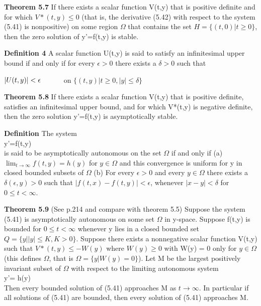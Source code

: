 \documentclass{article}
\newcommand\tab[1][1cm]{\hspace*{#1}}
\begin{document}
\textbf {Theorem 5.7} If there exists a scalar function V(t,y) that is positive definite and for which $V*(t,y) \leq 0$ (that is, the derivative (5.42) with respect to the system (5.41) is nonpositive) on some region $\Omega$ that contains the set $H = \{(t,0) | t \geq 0\}$, then the zero solution of y'=f(t,y) is stable.

\textbf {Definition 4} A scalar function U(t,y) is said to satisfy an infinitesimal upper bound if and only if for every $\epsilon > 0$ there exists a $\delta > 0$ such that
\begin{center}
$|U(t,y)| < \epsilon \tab$ on $\{(t,y)| t \geq 0, |y| \leq \delta\}$
\end{center}

\textbf {Theorem 5.8} If there exists a scalar function V(t,y) that is positive definite, satisfies an infinitesimal upper bound, and for which V*(t,y) is negative definite, then the zero solution y'=f(t,y) is asymptotically stable.

\textbf {Definition} The system \\
y'=f(t,y) \\
is said to be asymptotically autonomous on the set $\Omega$ if and only if (a) $\lim_{t \to \infty} f(t,y) = h(y)$ for $y \in \Omega$ and this convergence is uniform for y in closed bounded subsets of $\Omega$ (b) For every $\epsilon > 0$ and every $y \in \Omega$ there exists a $\delta(\epsilon, y)> 0$ such that $|f(t,x) - f(t,y)| < \epsilon$, whenever $|x-y|< \delta$ for $0 \leq t < \infty$.

\textbf {Theorem 5.9} (See p.214 and compare with theorem 5.5) Suppose the system (5.41) is asymptotically autonomous on some set $\Omega$ in y-space. Suppose f(t,y) is bounded for $0 \leq t < \infty$ whenever y lies in a closed bounded set $Q = \{y| |y| \leq K, K > 0\}$. Suppose there exists a nonnegative scalar function V(t,y) such that $V*(t,y) \leq -W(y)$ where $W(y) \geq 0$ with W(y) = 0 only for $y \in \Omega$ (this defines $\Omega$, that is $\Omega = \{ y | W(y) = 0\}$). Let M be the largest positively invariant subset of $\Omega$ with respect to the limiting autonomous system 
\\
\tab y'= h(y) \\
Then every bounded solution of (5.41) approaches M as $t \to \infty$. In particular if all solutions of (5.41) are bounded, then every solution of (5.41) approaches M.
\end{document}
